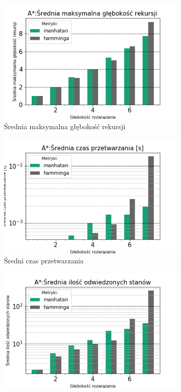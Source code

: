 \documentclass{classrep}
\begin{document}
\begin{figure}[H]
    \begin{subfigure}[t]{0.45\textwidth}
        \includegraphics[width=\textwidth]{charts/ASTR_recursed.png}
        \caption{Średnia maksymalna głębokość rekursji}
        \label{ASTR:rescursed}
    \end{subfigure}
    \begin{subfigure}[t]{0.45\textwidth}
        \includegraphics[width=\textwidth]{charts/ASTR_time.png}
        \caption{Średni czas przetwarzania}
        \label{ASTR:time}
    \end{subfigure}
    \begin{subfigure}[t]{0.45\textwidth}
        \includegraphics[width=\textwidth]{charts/ASTR_visited.png}

\end{subfigure}
\end{figure}
\end{document}
